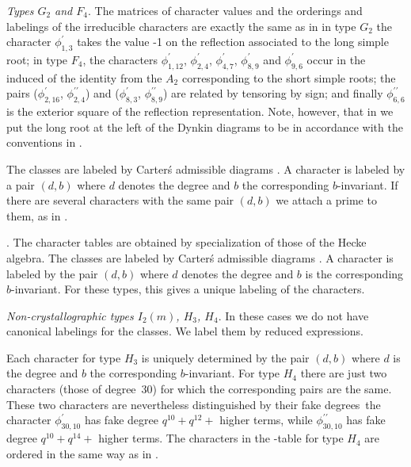 \smallskip
{\em  Types  $G_2$  and  $F_4$}.  The  matrices of character values and the
orderings  and labelings of the irreducible characters are exactly the same
as in \cite[p.412/413]{Car85}\: in type $G_2$ the character
$\phi_{1,3}^\prime$  takes the value -1 on the reflection associated to the
long  simple  root;  in  type  $F_4$,  the characters $\phi_{1,12}^\prime$,
$\phi_{2,4}^\prime$,     $\phi_{4,7}^\prime$,    $\phi_{8,9}^\prime$    and
$\phi_{9,6}^\prime$  occur in  the induced  of the  identity from the $A_2$
corresponding  to the short simple  roots; the pairs ($\phi_{2,16}^\prime$,
$\phi_{2,4}^{\prime\prime}$) and ($\phi_{8,3}^\prime$,
$\phi_{8,9}^{\prime\prime}$)  are related by tensoring by sign; and finally
$\phi_{6,6}^{\prime\prime}$  is  the  exterior  square  of  the  reflection
representation.  Note, however, that  in {\CHEVIE} we  put the long root at
the left of the Dynkin diagrams to be in accordance with the conventions in
\cite[(4.8) and (4.10)]{Lus85}.

The  classes are labeled  by Carter\'s admissible  diagrams \cite{Car72}. A
character is labeled by a pair $(d,b)$ where $d$ denotes the degree and $b$
the  corresponding $b$-invariant. If there  are several characters with the
same pair $(d,b)$ we attach a prime to them, as in \cite{Car85}.

. The character tables are obtained by
specialization  of those of  the Hecke algebra.  The classes are labeled by
Carter\'s  admissible diagrams \cite{Car72}. A  character is labeled by the
pair  $(d,b)$ where  $d$ denotes  the degree  and $b$  is the corresponding
$b$-invariant.  For  these  types,  this  gives  a  unique  labeling of the
characters.

\smallskip
{\em  Non-crystallographic types $I_2(m)$, $H_3$, $H_4$}. In these cases we
do  not have canonical labelings for the  classes. We label them by reduced
expressions.

Each  character for type  $H_3$ is uniquely  determined by the pair $(d,b)$
where  $d$ is the degree and  $b$ the corresponding $b$-invariant. For type
$H_4$  there are just  two characters (those  of degree~$30$) for which the
corresponding  pairs are  the same.  These two  characters are nevertheless
distinguished by their fake degrees\:\ the character
$\phi_{30,10}^\prime$  has  fake  degree  $q^{10}+q^{12}+$  higher terms,
while $\phi_{30,10}^{\prime\prime}$ has fake degree $q^{10}+q^{14}+$ higher
terms.  The characters in  the \CHEVIE-table for  type $H_4$ are ordered in
the same way as in \cite{AL82}.

